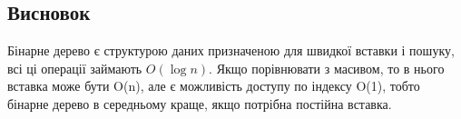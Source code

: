 \documentclass[12pt]{extarticle}
\begin{document}
\subsection*{Висновок} 
Бінарне дерево є структурою даних призначеною для швидкої вставки і пошуку,
всі ці операції займають $O(\log n)$. Якщо порівнювати з масивом, то в нього вставка
може бути O(n), але є можливість доступу по індексу O(1), тобто бінарне дерево в середньому краще, якщо
потрібна постійна вставка.
\end{document}
